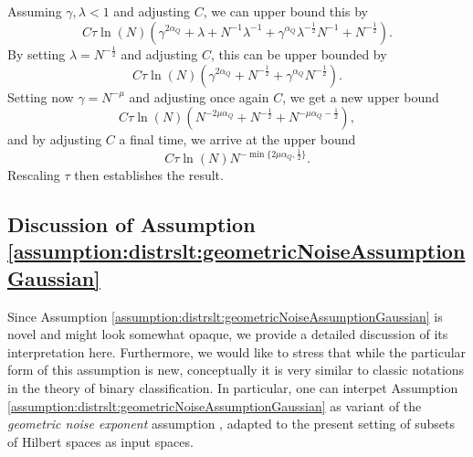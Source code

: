 \documentclass[letterpaper]{article} %
\begin{document}
Assuming $\gamma,\lambda<1$ and adjusting $C$, we can upper bound this by
\begin{equation*}
    C \tau \ln(N)\left(
       \gamma^{2\alpha_Q} + \lambda + N^{-1}\lambda^{-1} + \gamma^{\alpha_Q} \lambda^{-\frac12}N^{-1} 
       +  N^{-\frac12}
    \right).
\end{equation*}
By setting $\lambda=N^{-\frac12}$ and adjusting $C$, this can be upper bounded by
\begin{equation*}
    C \tau \ln(N)\left(
       \gamma^{2\alpha_Q} + N^{-\frac12} + \gamma^{\alpha_Q} N^{-\frac12}
    \right).
\end{equation*}
Setting now $\gamma=N^{-\mu}$ and adjusting once again $C$, we get a new upper bound
\begin{equation*}
        C \tau \ln(N)\left( N^{-2\mu\alpha_Q} + N^{-\frac12} + N^{-\mu\alpha_Q-\frac12}
    \right),
\end{equation*}
and by adjusting $C$ a final time, we arrive at the upper bound
\begin{equation*}
     C \tau \ln(N) N^{-\min\{2\mu\alpha_Q, \frac12\}}.
\end{equation*}
Rescaling $\tau$ then establishes the result.
\subsection{Discussion of Assumption \ref{assumption:distrslt:geometricNoiseAssumptionGaussian}} \label{sec:distrslt:discussionOfgeometricNoiseAssumptionGaussian}
Since Assumption \ref{assumption:distrslt:geometricNoiseAssumptionGaussian} is novel and might look somewhat opaque, we provide a detailed discussion of its interpretation here.
Furthermore, we would like to stress that while the particular form of this assumption is new,
conceptually it is very similar to classic notations in the theory of binary classification.
In particular, one can interpet Assumption \ref{assumption:distrslt:geometricNoiseAssumptionGaussian} as variant of the \emph{geometric noise exponent} assumption \cite[Definition~2.3]{steinwart2007fast}, adapted to the present setting of subsets of Hilbert spaces as input spaces.
\end{document}

